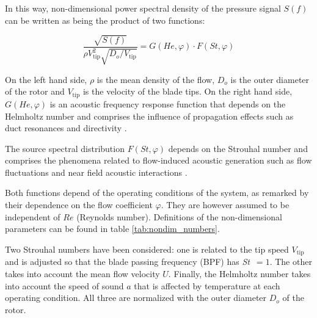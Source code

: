 In this way, non-dimensional power spectral density of the pressure signal $S(f)$ can be written \cite{mongeau1993sound,choi1994aerodynamic} as being the product of two functions: 

\begin{equation}\label{eq:non-dim_spectra}
	\frac{\sqrt{S(f)}}{\rho V^2_\text{tip}\sqrt{D_o/V_\text{tip}}}=
	G(He,\varphi)\cdot F(St,\varphi)
\end{equation}

On the left hand side, $\rho$ is the mean density of the flow, $D_o$ is the outer diameter of the rotor and $V_\text{tip}$ is the velocity of the blade tips. On the right hand side, $G(He,\varphi)$ is an acoustic frequency response function that depends on the Helmholtz number and comprises the influence of propagation effects such as duct resonances and directivity \cite{mongeau1993sound,wolfram2009detection}. 

The source spectral distribution $F(St,\varphi)$ depends on the Strouhal number and comprises the phenomena related to flow-induced acoustic generation such as flow fluctuations and near field acoustic interactions \cite{mongeau1995method}.

Both functions depend of the operating conditions of the system, as remarked by their dependence on the flow coefficient $\varphi$. They are however assumed to be independent of $Re$ (Reynolds number). Definitions of the non-dimensional parameters can be found in table \ref{tab:nondim_numbers}. 

Two Strouhal numbers have been considered: one is related to the tip speed $V_\text{tip}$ and is adjusted so that the blade passing frequency (BPF) has \textit{St}~$=1$. The other takes into account the mean flow velocity $U$. Finally, the Helmholtz number takes into account the speed of sound $a$ that is affected by temperature at each operating condition. All three are normalized with the outer diameter $D_o$ of the rotor.

